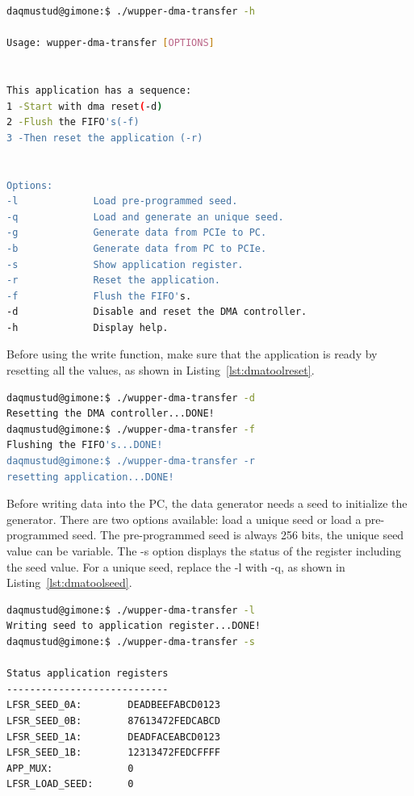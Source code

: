 \begin{lstlisting}[language=BASH, frame=single, label={lst:dmatoollist}, caption=Output of Wupper-dma-transfer -h]
daqmustud@gimone:$ ./wupper-dma-transfer -h

Usage: wupper-dma-transfer [OPTIONS]


This application has a sequence: 
1 -Start with dma reset(-d)
2 -Flush the FIFO's(-f)
3 -Then reset the application (-r)


Options:
-l             Load pre-programmed seed.
-q             Load and generate an unique seed.
-g             Generate data from PCIe to PC.
-b             Generate data from PC to PCIe.
-s             Show application register.
-r             Reset the application.
-f             Flush the FIFO's.
-d             Disable and reset the DMA controller.
-h             Display help.


\end{lstlisting}


Before using the write function, make sure that the application is ready by resetting all the values, as shown in Listing~\ref{lst:dmatoolreset}.

\begin{lstlisting}[language=BASH, frame=single, label={lst:dmatoolreset},  caption=Reset Wupper before a DMA Write action]
daqmustud@gimone:$ ./wupper-dma-transfer -d
Resetting the DMA controller...DONE! 
daqmustud@gimone:$ ./wupper-dma-transfer -f
Flushing the FIFO's...DONE! 
daqmustud@gimone:$ ./wupper-dma-transfer -r
resetting application...DONE! 
\end{lstlisting}


\newpage

\newpage

\noindent
Before writing data into the PC, the data generator needs a seed to initialize the generator. There are two options available: load a unique seed or load a pre-programmed seed. The pre-programmed seed is always 256 bits, the unique seed value can be variable. The -s option displays the status of the register including the seed value. For a unique seed, replace the -l with -q, as shown in Listing~\ref{lst:dmatoolseed}.

\begin{lstlisting}[language=BASH, frame=single, label={lst:dmatoolseed}, caption=Loading a pre-programmed seed in to the data generator.]
daqmustud@gimone:$ ./wupper-dma-transfer -l
Writing seed to application register...DONE! 
daqmustud@gimone:$ ./wupper-dma-transfer -s

Status application registers
----------------------------
LFSR_SEED_0A:        DEADBEEFABCD0123 
LFSR_SEED_0B:        87613472FEDCABCD 
LFSR_SEED_1A:        DEADFACEABCD0123 
LFSR_SEED_1B:        12313472FEDCFFFF 
APP_MUX:             0 
LFSR_LOAD_SEED:      0
\end{lstlisting}


